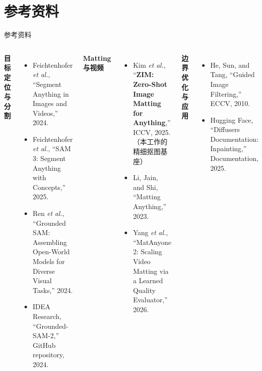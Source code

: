 \documentclass[aspectratio=169]{beamer}
\begin{document}
\section{参考资料}
\begin{frame}[t]{参考资料}
  \footnotesize
  \linespread{0.94}\selectfont
  \begin{columns}[T,onlytextwidth]
      {\color{nankai}\bfseries 目标定位与分割}\par
      \vspace{0.12em}
      {\footnotesize
      \raggedright
      \begin{itemize}
        \setlength{\itemsep}{0.16em}
        \item[\textcolor{nankai}{[1]}] Feichtenhofer \textit{et al.}, ``Segment Anything in Images and Videos,'' 2024.
        \item[\textcolor{nankai}{[2]}] Feichtenhofer \textit{et al.}, ``SAM 3: Segment Anything with Concepts,'' 2025.
        \item[\textcolor{nankai}{[3]}] Ren \textit{et al.}, ``Grounded SAM: Assembling Open-World Models for Diverse Visual Tasks,'' 2024.
        \item[\textcolor{nankai}{[4]}] IDEA Research, ``Grounded-SAM-2,'' GitHub repository, 2024.
      \end{itemize}}
      {\color{nankai}\bfseries Matting 与视频}\par
      \vspace{0.12em}
      {\footnotesize
      \raggedright
      \begin{itemize}
        \setlength{\itemsep}{0.14em}
        \item[\textcolor{nankai}{[5]}] Kim \textit{et al.}, ``\textbf{ZIM: Zero-Shot Image Matting for Anything},'' ICCV, 2025.\; {\scriptsize（本工作的精细抠图基座）}
        \item[\textcolor{nankai}{[6]}] Li, Jain, and Shi, ``Matting Anything,'' 2023.
        \item[\textcolor{nankai}{[7]}] Yang \textit{et al.}, ``MatAnyone 2: Scaling Video Matting via a Learned Quality Evaluator,'' 2026.
      \end{itemize}}

      \vspace{0.10em}
      {\color{nankai}\bfseries 边界优化与应用}\par
      \vspace{0.12em}
      {\footnotesize
      \raggedright
      \begin{itemize}
        \setlength{\itemsep}{0.14em}
        \item[\textcolor{nankai}{[8]}] He, Sun, and Tang, ``Guided Image Filtering,'' ECCV, 2010.
        \item[\textcolor{nankai}{[9]}] Hugging Face, ``Diffusers Documentation: Inpainting,'' Documentation, 2025.
      \end{itemize}}

  \end{columns}
\end{frame}
\end{document}
